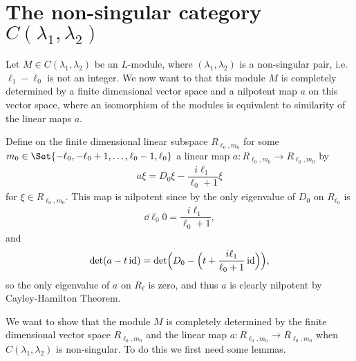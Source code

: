 \section{\texorpdfstring{The non-singular category $C(\lambda_1,\lambda_2)$}{The non-singular category C(lambda\_1,lambda\_2)}}

Let $M\in C(\lambda_1,\lambda_2)$ be an $L$-module, where $(\lambda_1,\lambda_2)$ is a non-singular pair, i.e.\ $\ell_1-\ell_0$ is not an integer. We now want to that this module $M$ is completely determined by a finite dimensional vector space and a nilpotent map $a$ on this vector space, where an isomorphism of the modules is equivalent to similarity of the linear maps $a$.

Define on the finite dimensional linear subspace $R_{\ell_0,m_0}$ for some $m_0\in \Set{-\ell_0,-\ell_0+1,\dotsc,\ell_0-1,\ell_0}$ a linear map $a\colon R_{\ell_0,m_0}\to R_{\ell_0,m_0}$ by
\begin{align}\label{eq:adef}
  a\xi = D_0\xi - \dfrac{i\ell_1}{\ell_0+1}\xi
\end{align}
for $\xi\in R_{\ell_0,m_0}$. This map is nilpotent since by  the only eigenvalue of $D_0$ on $R_{\ell_0}$ is
\begin{align*}
  \dd{\ell_0}{0} = \dfrac{i\ell_1}{\ell_0+1},
\end{align*}
and
\begin{align*}
  \det(a-t\operatorname{id}) = \det\Bigl( D_0 - \Bigl(t+\dfrac{i\ell_1}{\ell_0+1}\operatorname{id} \Bigr) \Bigr),
\end{align*}
so the only eigenvalue of $a$ on $R_\ell$ is zero, and thus $a$ is clearly nilpotent by Cayley-Hamilton Theorem.

We want to show that the module $M$ is completely determined by the finite dimensional vector space $R_{\ell_0,m_0}$ and the linear map $a\colon R_{\ell_0,m_0}\to R_{\ell_0,m_0}$ when $C(\lambda_1,\lambda_2)$ is non-singular. To do this we first need some lemmas.

